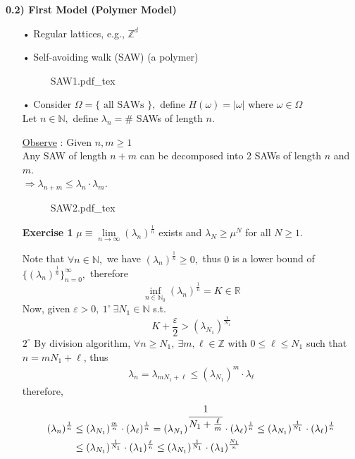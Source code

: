 \documentclass[12pt,a4paper]{article}
\newcommand{\incfig}[1]{%
{#1.pdf_tex}
}
\begin{document}
\newpage
\begin{flushleft}
	\Large \textbf{0.2) First Model (Polymer Model)}
\end{flushleft}
\begin{enumerate}
	\item[•] Regular lattices, e.g., $\mathbb{Z}^d$
	\item[•] Self-avoiding walk (SAW) (a polymer)
	\begin{figure}[htp]
	\centering
	\def\svgwidth{7cm}
	\incfig{SAW1}
	\end{figure}
	\item[•] Consider $\Omega=\{\mbox{ all SAWs } \},$ define $H(\omega)=|\omega|$ where $\omega\in\Omega$\\
	Let $n\in \mathbb{N},$ define $\lambda_n=\#$ SAWs of length $n.$
	\item[\underline{Observe} : ] Given $n,m\geq 1$\\
	Any SAW of length $n+m$ can be decomposed into 2 SAWs of length $n$ and $m.$\\
	$\Rightarrow \lambda_{n+m}\leq \lambda_n\cdot \lambda_m.$
	\begin{figure}[htp]
	\centering
	\def\svgwidth{7cm}
	\incfig{SAW2}
	\end{figure}
	\item[\textbf{Exercise 1}] $\mu\equiv \lim\limits_{n\to\infty}(\lambda_n)^{\frac{1}{n}}$ exists and $\lambda_N\geq \mu^N$ for all $N\geq 1.$
	\item[\fbox{SOL}] Note that $\forall n\in \mathbb{N},$ we have $(\lambda_n)^{\frac{1}{n}}\geq 0,$ thus $0$ is a lower bound of $\{(\lambda_n)^{\frac{1}{n}}\}_{n=0}^\infty,$ therefore
	\[
	\inf_{n\in\mathbb{N}_0}(\lambda_n)^{\frac{1}{n}}=K\in\mathbb{R}
	\]
	Now, given $\varepsilon>0,\ 1^{\circ}\ \exists N_1\in\mathbb{N}$ s.t.
	\[
	K+\frac{\varepsilon}{2}>(\lambda_{N_1})^\frac{1}{N_1}
	\]
	$2^{\circ}$ By division algorithm, $\forall n\geq N_1,\ \exists m,\ell \in \mathbb{Z}$ with $0\leq \ell\leq N_1$ such that $n=mN_1+\ell$, thus
	\begin{align*}
	\lambda_n=\lambda_{mN_1+\ell}\leq (\lambda_{N_1})^m\cdot \lambda_\ell
	\end{align*}
	therefore,
	\begin{align*}
	(\lambda_n)^{\frac{1}{n}}&\leq (\lambda_{N_1})^{\frac{m}{n}}\cdot (\lambda_\ell)^{\frac{1}{n}}=(\lambda_{N_1})^{\cfrac{1}{N_1+\frac{\ell}{m}}}\cdot (\lambda_\ell)^\frac{1}{n}\leq (\lambda_{N_1})^\frac{1}{N_1}\cdot (\lambda_\ell)^\frac{1}{n}\\
	&\leq (\lambda_{N_1})^\frac{1}{N_1}\cdot (\lambda_1)^\frac{\ell}{n}\leq (\lambda_{N_1})^\frac{1}{N_1}\cdot (\lambda_1)^\frac{N_1}{n}

\end{align*}
\end{enumerate}
\end{document}

